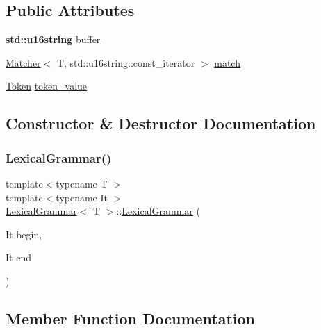 \subsection*{Public Attributes}
\begin{DoxyCompactItemize}
\item 
\textbf{ std\+::u16string} \hyperlink{class_lexical_grammar_af23cc1b7472da117c7e39a8b8fe45e04}{buffer}
\item 
\hyperlink{class_matcher}{Matcher}$<$ T, std\+::u16string\+::const\+\_\+iterator $>$ \hyperlink{class_lexical_grammar_a868dc475274f55ff285fd26593f9d0a5}{match}
\item 
\hyperlink{class_token}{Token} \hyperlink{class_lexical_grammar_a3230ebef29d379b7b4c276e2a771edc4}{token\+\_\+value}
\end{DoxyCompactItemize}


\subsection{Constructor \& Destructor Documentation}
\mbox{\label{class_lexical_grammar_ae00a07b2f2c282a59d8df82c0596cc04}} 
\subsubsection{\texorpdfstring{Lexical\+Grammar()}{LexicalGrammar()}}
{\footnotesize\ttfamily template$<$typename T $>$ \\
template$<$typename It $>$ \\
\hyperlink{class_lexical_grammar}{Lexical\+Grammar}$<$ T $>$\+::\hyperlink{class_lexical_grammar}{Lexical\+Grammar} (\begin{DoxyParamCaption}\item[{It}]{begin,  }\item[{It}]{end }\end{DoxyParamCaption})\hspace{0.3cm}{\ttfamily [inline]}}



\subsection{Member Function Documentation}
\mbox{\label{class_lexical_grammar_a80b7dcb7b99bbd553581cd162cd80cb1}} 
